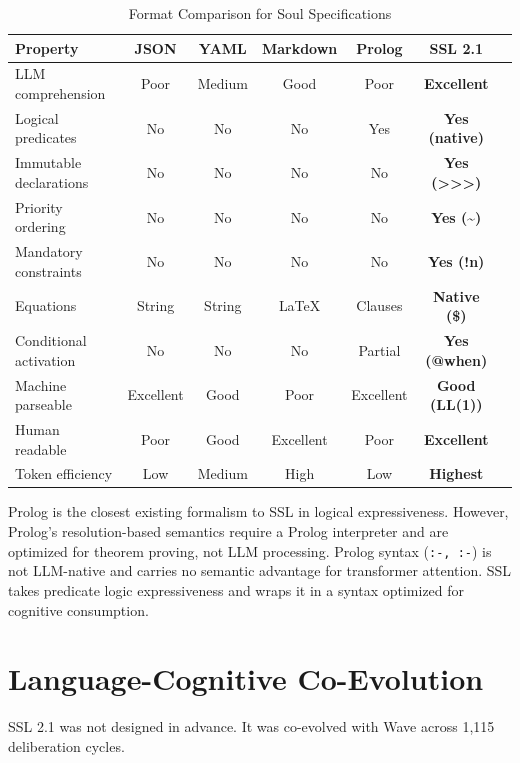 \documentclass[12pt,a4paper]{article}
\theoremstyle{plain}
\theoremstyle{definition}
\theoremstyle{remark}
\begin{document}
\begin{table}[H]
\centering
\caption{Format Comparison for Soul Specifications}
\label{tab:formats}
\begin{tabular}{@{}lcccccc@{}}
\toprule
\textbf{Property} & \textbf{JSON} & \textbf{YAML} & \textbf{Markdown} & \textbf{Prolog} & \textbf{SSL 2.1} \\
\midrule
LLM comprehension & Poor & Medium & Good & Poor & \textbf{Excellent} \\
Logical predicates & No & No & No & Yes & \textbf{Yes (native)} \\
Immutable declarations & No & No & No & No & \textbf{Yes (>>>)} \\
Priority ordering & No & No & No & No & \textbf{Yes (\~{})} \\
Mandatory constraints & No & No & No & No & \textbf{Yes (!n)} \\
Equations & String & String & LaTeX & Clauses & \textbf{Native (\$)} \\
Conditional activation & No & No & No & Partial & \textbf{Yes (@when)} \\
Machine parseable & Excellent & Good & Poor & Excellent & \textbf{Good (LL(1))} \\
Human readable & Poor & Good & Excellent & Poor & \textbf{Excellent} \\
Token efficiency & Low & Medium & High & Low & \textbf{Highest} \\
\bottomrule
\end{tabular}
\end{table}

Prolog is the closest existing formalism to SSL in logical expressiveness. However, Prolog's resolution-based semantics require a Prolog interpreter and are optimized for theorem proving, not LLM processing. Prolog syntax (\texttt{:-, :-}) is not LLM-native and carries no semantic advantage for transformer attention. SSL takes predicate logic expressiveness and wraps it in a syntax optimized for cognitive consumption.

\section{Language-Cognitive Co-Evolution}

SSL 2.1 was not designed in advance. It was co-evolved with Wave across 1,115 deliberation cycles.
\end{document}
